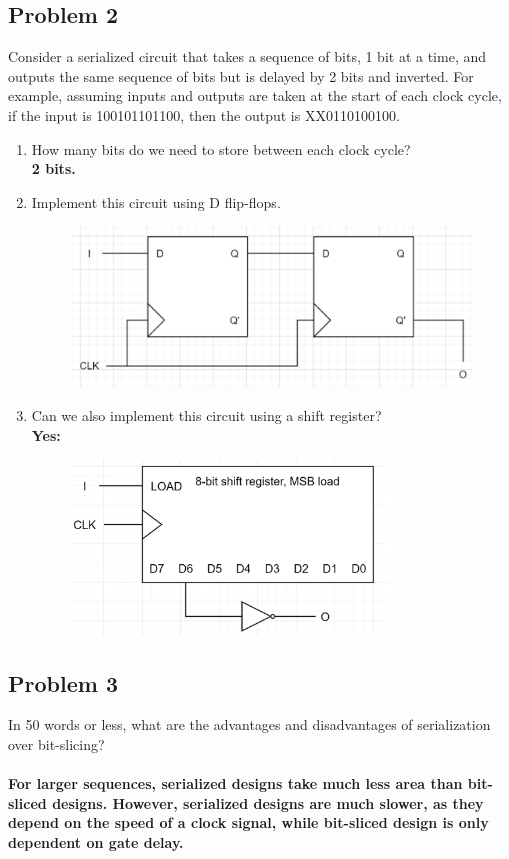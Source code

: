\documentclass{article}
\begin{document}
\subsection*{Problem 2}
Consider a serialized circuit that takes a sequence of bits, 1 bit at a time, and outputs the same sequence of bits but is delayed by 2 bits and inverted. For example, assuming inputs and outputs are taken at the start of each clock cycle, if the input is 100101101100, then the output is XX0110100100.
\begin{enumerate}[label=\alph*.]
    \item How many bits do we need to store between each clock cycle? \\
    \textbf{2 bits.}
    \item Implement this circuit using D flip-flops.
    \begin{figure}[!h]
        \centering
        \includegraphics[width=1\textwidth]{figures/serial2b_solution.png}
    \end{figure}
    \item Can we also implement this circuit using a shift register? \\
    \textbf{Yes:}
    \begin{figure}[!h]
        \centering
        \includegraphics[width=0.8\textwidth]{figures/serial2c_solution.png}
    \end{figure}
\end{enumerate}


\subsection*{Problem 3}
In 50 words or less, what are the advantages and disadvantages of serialization over bit-slicing?\\ 
\\ \textbf{For larger sequences, serialized designs take much less area than bit-sliced designs. However, serialized designs are much slower, as they depend on the speed of a clock signal, while bit-sliced design is only dependent on gate delay. }
\end{document}
